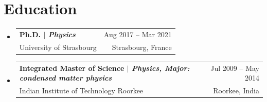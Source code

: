 \documentclass[A4,11pt]{article}
\makeatletter
\newcommand{\CVSubheading}[4]{
  \vspace{-2pt}\item
    \begin{tabular*}{0.97\textwidth}[t]{l@{\extracolsep{\fill}}r}
      \textbf{#1} & #2 \\
      \small#3 & \small #4 \\
    \end{tabular*}\vspace{-7pt}
}
\newcommand{\CVSubHeadingListStart}{\begin{itemize}[leftmargin=0.5cm, label={}]}
\newcommand{\CVSubHeadingListEnd}{\end{itemize}}
\makeatother
\begin{document}

\section{Education}
  \CVSubHeadingListStart
    \CVSubheading
      {{Ph.D. $|$ \emph{\small{Physics}}}}{Aug 2017 -- Mar 2021}
      {University of Strasbourg}{Strasbourg, France}
    \CVSubheading
      {{Integrated Master of Science $|$ \emph{\small{Physics, Major: condensed
              matter physics}}}}{Jul 2009 -- May 2014}
      {Indian Institute of Technology Roorkee}{Roorkee, India}
  \CVSubHeadingListEnd

\end{document}
